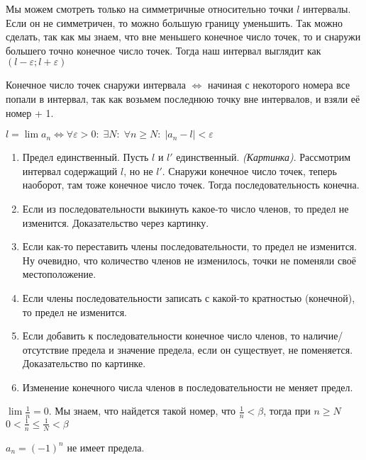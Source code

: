 \begin{remark}
    Мы можем смотреть только на симметричные относительно точки $l$ интервалы. Если он не симметричен, то можно большую границу уменьшить. Так можно сделать, так как мы знаем, что вне меньшего конечное число точек, то и снаружи большего точно конечное число точек. Тогда наш интервал выглядит как $(l - \varepsilon; l + \varepsilon)$
\end{remark}
\begin{remark}
    Конечное число точек снаружи интервала $\iff$ начиная с некоторого номера все попали в интервал, так как возьмем последнюю точку вне интервалов, и взяли её номер + 1.
\end{remark}
\begin{definition}
    $l = \lim a_n \iff \forall \varepsilon > 0: \; \exists N: \; \forall n\ge N: \;  |a_n-l| < \varepsilon$
\end{definition}
\begin{enumerate}
    \item Предел единственный. Пусть $l$ и  $l'$ единственный. \emph{(Картинка)}. Рассмотрим интервал содержащий  $l$, но не  $l'$. Снаружи конечное число точек, теперь наоборот, там тоже конечное число точек. Тогда последовательность конечна.
    \item Если из последовательности выкинуть какое-то число членов, то предел не изменится. Доказательство через картинку.
    \item Если как-то переставить члены последовательности, то предел не изменится. Ну очевидно, что количество членов не изменилось, точки не поменяли своё местоположение.
    \item Если члены последовательности записать с какой-то кратностью (конечной), то предел не изменится.
    \item Если добавить к последовательности конечное число членов, то наличие/отсутствие предела и значение предела, если он существует, не поменяется. Доказательство по картинке.
    \item Изменение конечного числа членов в последовательности не меняет предел.
\end{enumerate}
\begin{example}
    $\lim \frac{1}{n} = 0$. Мы знаем, что найдется такой номер, что $\frac{1}{n} < \beta$, тогда при $n \ge N$ $0 < \frac{1}{n} \le \frac{1}{N} < \beta$
\end{example}
\begin{example}
    $a_n = (-1)^n$ не имеет предела.
\end{example}
